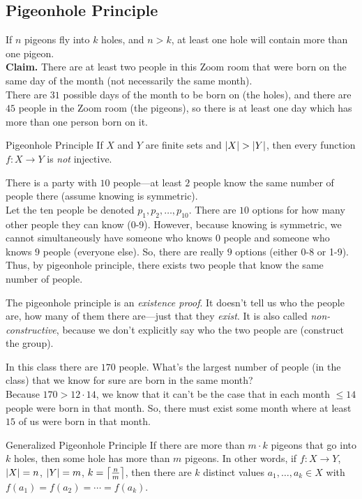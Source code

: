 \documentclass[class=article, crop=false]{standalone}
\begin{document}
  \subsection{Pigeonhole Principle}
  If $n$ pigeons fly into $k$ holes, and $n>k$, at least one hole will contain more than one pigeon. \\[10pt]
  \textbf{Claim.} There are at least two people in this Zoom room that were born on the same day of the month (not necessarily the same month). \\[10pt]
  There are $31$ possible days of the month to be born on (the holes), and there are $45$ people in the Zoom room (the pigeons), so there is at least one day which has more than one person born on it.
  \begin{definition}{Pigeonhole Principle}
    If $X$ and $Y$ are finite sets and $\left\lvert X \right\rvert > \left\lvert Y \right\rvert$, then every function $f\colon X\to Y$ is \emph{not} injective.
  \end{definition}
  \begin{example}{}
    There is a party with $10$ people---at least $2$ people know the same number of people there (assume knowing is symmetric). \\[10pt]
    Let the ten people be denoted $p_1, p_2, \dotsc, p_{10}$. There are $10$ options for how many other people they can know (0-9). However, because knowing is symmetric, we cannot simultaneously have someone who knows $0$ people and someone who knows $9$ people (everyone else). So, there are really $9$ options (either 0-8 or 1-9). Thus, by pigeonhole principle, there exists two people that know the same number of people.
  \end{example}
  \begin{note}{}
    The pigeonhole principle is an \emph{existence proof}. It doesn't tell us who the people are, how many of them there are---just that they \emph{exist}. It is also called \emph{non-constructive}, because we don't explicitly say who the two people are (construct the group).
  \end{note}
  \begin{example}{}
    In this class there are $170$ people. What's the largest number of people (in the class) that we know for sure are born in the same month? \\[10pt]
    Because $170 > 12\cdot 14$, we know that it can't be the case that in each month $\leq 14$ people were born in that month. So, there must exist some month where at least $15$ of us were born in that month.
  \end{example}
  \begin{definition}{Generalized Pigeonhole Principle}
    If there are more than $m\cdot k$ pigeons that go into $k$ holes, then some hole has more than $m$ pigeons. In other words, if $f\colon X\to Y$, $\left\lvert X \right\rvert=n$, $\left\lvert Y \right\rvert=m$, $k=\left\lceil \frac{n}{m} \right\rceil$, then there are $k$ distinct values $a_1, \dotsc, a_k\in X$ with $f(a_1) = f(a_2) = \dotsb = f(a_k)$.
  \end{definition}
\end{document}
